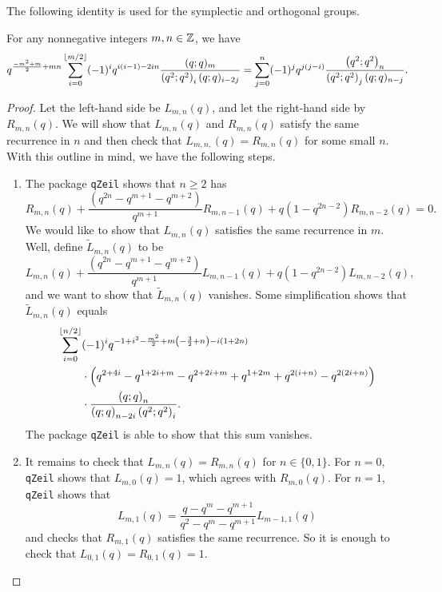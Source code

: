 The following identity is used for the symplectic and orthogonal groups.
\begin{prop} \label{prop:sp-q-identity}
    For any nonnegative integers $m,n\in\mathbb Z$, we have
    \[q^{\frac{-m^2+m}2+mn}\sum_{i=0}^{\left\lfloor{m/2}\right\rfloor}(-1)^iq^{i(i-1)-2in}\frac{(q;q)_m}{\left(q^2;q^2\right)_i(q;q)_{i-2j}}=\sum_{j=0}^n(-1)^jq^{j(j-i)}\frac{\left(q^2;q^2\right)_{n}}{\left(q^2;q^2\right)_j(q;q)_{n-j}}.\]
\end{prop}
\begin{proof}
    Let the left-hand side be $L_{m,n}(q)$, and let the right-hand side by $R_{m,n}(q)$. We will show that $L_{m,n}(q)$ and $R_{m,n}(q)$ satisfy the same recurrence in $n$ and then check that $L_{m,n,}(q)=R_{m,n}(q)$ for some small $n$. With this outline in mind, we have the following steps.
    \begin{enumerate}
        \item The package \texttt{qZeil} shows that $n\ge2$ has
        \[R_{m,n}\left(q\right)+\frac{\left(q^{2n}-q^{m+1}-q^{m+2}\right)}{q^{m+1}}R_{m,n-1}\left(q\right)+q\left(1-q^{2n-2}\right)R_{m,n-2}\left(q\right)=0.\]
        We would like to show that $L_{m,n}(q)$ satisfies the same recurrence in $m$. Well, define $\widetilde L_{m,n}(q)$ to be
        \[L_{m,n}\left(q\right)+\frac{\left(q^{2n}-q^{m+1}-q^{m+2}\right)}{q^{m+1}}L_{m,n-1}\left(q\right)+q\left(1-q^{2n-2}\right)L_{m,n-2}\left(q\right),\]
        and we want to show that $\widetilde L_{m,n}(q)$ vanishes. Some simplification shows that $\widetilde L_{m,n}(q)$ equals
        \begin{align*}
            \sum_{i=0}^{\left\lfloor{n/2}\right\rfloor}&(-1)^iq^{-1+i^2-\frac{m^2}2+m\left(-\frac32+n\right)-i(1+2n)} \\
            &\cdot\left(q^{2+4i}-q^{1+2i+m}-q^{2+2i+m}+q^{1+2m}+q^{2(i+n)}-q^{2(2i+n)}\right) \\
            &\cdot\frac{\left(q;q\right)_n}{\left(q;q\right)_{n-2i}\left(q^{2};q^{2}\right)_i}.
        \end{align*}
        The package \texttt{qZeil} is able to show that this sum vanishes.
        \item It remains to check that $L_{m,n}(q)=R_{m,n}(q)$ for $n\in\{0,1\}$. For $n=0$, \texttt{qZeil} shows that $L_{m,0}(q)=1$, which agrees with $R_{m,0}(q)$. For $n=1$, \texttt{qZeil} shows that
        \[L_{m,1}(q)=\frac{q-q^m-q^{m+1}}{q^2-q^m-q^{m+1}}L_{m-1,1}(q)\]
        and checks that $R_{m,1}(q)$ satisfies the same recurrence. So it is enough to check that $L_{0,1}(q)=R_{0,1}(q)=1$.
        \qedhere
    \end{enumerate}
\end{proof}


